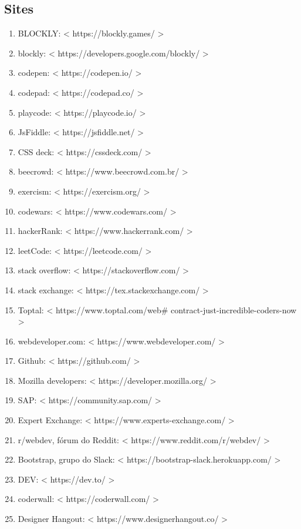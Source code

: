 \documentclass[12pt,a4paper]{article} %
\begin{document}
		\subsection{Sites}
			\begin{enumerate}
					\item BLOCKLY: < https://blockly.games/ >
					\item blockly: < https://developers.google.com/blockly/ >
					\item codepen: < https://codepen.io/ >
					\item codepad: < https://codepad.co/ >
					\item playcode: < https://playcode.io/ >
					\item JsFiddle: < https://jsfiddle.net/ >
					\item CSS deck: < https://cssdeck.com/ >
					\item beecrowd: < https://www.beecrowd.com.br/ >
					\item exercism: < https://exercism.org/ >
					\item codewars: < https://www.codewars.com/ >
					\item hackerRank: < https://www.hackerrank.com/ >
					\item leetCode: < https://leetcode.com/ >
					\item stack overflow: < https://stackoverflow.com/ >
					\item stack exchange: < https://tex.stackexchange.com/ >
					\item Toptal: < https://www.toptal.com/web\# contract-just-incredible-coders-now >
					\item webdeveloper.com: < https://www.webdeveloper.com/ >
					\item Github: < https://github.com/ >
					\item Mozilla developers: < https://developer.mozilla.org/ >
					\item SAP: < https://community.sap.com/ >
					\item Expert Exchange: < https://www.experts-exchange.com/ >
					\item r/webdev, fórum do Reddit: < https://www.reddit.com/r/webdev/ >
					\item Bootstrap, grupo do Slack: < https://bootstrap-slack.herokuapp.com/ >
					\item DEV: < https://dev.to/ >
					\item coderwall: < https://coderwall.com/ >
					\item Designer Hangout: < https://www.designerhangout.co/ >

\end{enumerate}
\end{document}
